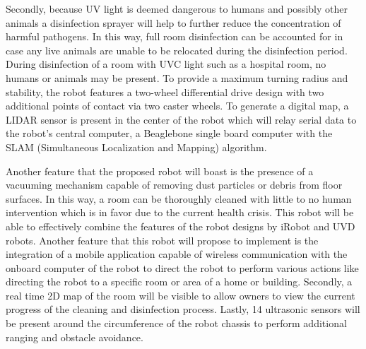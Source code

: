 \documentclass[10pt,a4paper]{article}
\begin{document}
%
Secondly, because UV light is deemed dangerous to humans and possibly other
animals a disinfection sprayer will help to further reduce the concentration of
harmful pathogens. In this way, full room disinfection can be accounted for in
case any live animals are unable to be relocated during the disinfection period.
During disinfection of a room with UVC light such as a hospital room, no humans
or animals may be present. To provide a maximum turning radius and stability,
the robot features a two-wheel differential drive design with two additional
points of contact via two caster wheels. To generate a digital map, a LIDAR
sensor is present in the center of the robot which will relay serial data to the
robot's central computer, a Beaglebone single board computer with the SLAM
(Simultaneous Localization and Mapping) algorithm.

Another feature that the proposed robot will boast is the presence of a
vacuuming mechanism capable of removing dust particles or debris from floor
surfaces. In this way, a room can be thoroughly cleaned with little to no human
intervention which is in favor due to the current health crisis. This robot will
be able to effectively combine the features of the robot designs by iRobot and
UVD robots. Another feature that this robot will propose to implement is the
integration of a mobile application capable of wireless communication with the
onboard computer of the robot to direct the robot to perform various actions
like directing the robot to a specific room or area of a home or building.
Secondly, a real time 2D map of the room will be visible to allow owners to view
the current progress of the cleaning and disinfection process. Lastly, 14
ultrasonic sensors will be present around the circumference of the robot chassis
to perform additional ranging and obstacle avoidance.
\end{document}
